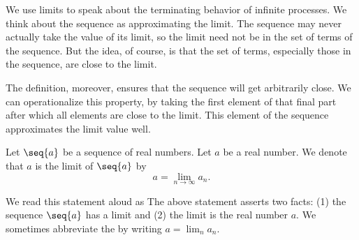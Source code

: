 We use limits to speak about
the terminating behavior of
infinite processes.
We think about the sequence
as approximating the limit.
The sequence may never
actually take the value
of its limit, so the
limit need not be in the
set of terms of the sequence.
But the idea, of course, is that the set of terms, especially those  in the sequence, are close to the limit.

The definition, moreover,
ensures that the sequence
will get arbitrarily close.
We can operationalize this
property, by taking the first
element of that final part
after which all elements are
close to the limit.
This element of the sequence approximates the limit value well.


Let $\seq{a}$
be a sequence of
real numbers.
Let $a$ be a real number.
We denote that $a$ is the limit of
$\seq{a}$ by
\[
  a = \lim_{n \to \infty} a_n.
\]

We read this statement aloud as
The above statement asserts two
facts: (1) the sequence
$\seq{a}$ has a limit and (2)
the limit is the real number $a$.
We sometimes abbreviate
the by writing
$a = \lim_{n} a_n$.

